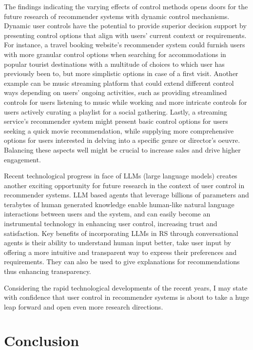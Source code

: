 \documentclass[a4paper,12pt]{article}
\begin{document}
The findings indicating the varying effects of control methods opens doors for the future research of recommender systems with dynamic control mechanisms. Dynamic user controls have the potential to provide superior decision support by presenting control options that align with users' current context or requirements. For instance, a travel booking website's recommender system could furnish users with more granular control options when searching for accommodations in popular tourist destinations with a multitude of choices to which user has previously been to, but more simplistic options in case of a first visit. Another example can be  music streaming platform that could extend different control ways depending on users' ongoing activities, such as providing streamlined controls for users listening to music while working and more intricate controls for users actively curating a playlist for a social gathering. Lastly, a streaming service's recommender system might present basic control options for users seeking a quick movie recommendation, while supplying more comprehensive options for users interested in delving into a specific genre or director's oeuvre. Balancing these aspects well might be crucial to increase sales and drive higher engagement.

Recent technological progress in face of LLMs (large language models) creates another exciting opportunity for future research in the context of user control in recommender systems. LLM based agents that leverage billions of parameters and terabytes of human generated knowledge enable human-like natural language interactions between users and the system, and can easily become an instrumental technology in enhancing user control, increasing trust and satisfaction. Key benefits of incorporating LLMs in RS through conversational agents is their ability to understand human input better, take user input by offering a more intuitive and transparent way to express their preferences and requirements. They can also be used to give explanations for recommendations thus enhancing transparency.

Considering the rapid technological developments of the recent years, I may state with confidence that user control in recommender systems is about to take a huge leap forward and open even more research directions. 

\newpage

\section{Conclusion}
\end{document}
